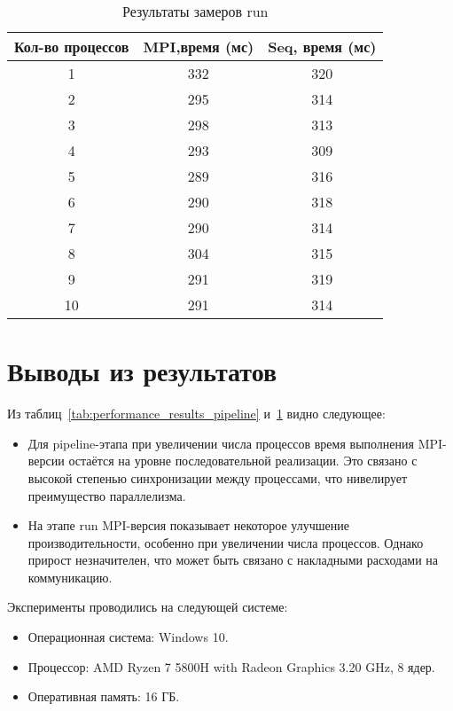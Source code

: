 \documentclass[12pt]{article}
\begin{document}
\begin{table}[htbp]
\centering
\caption{Результаты замеров run}
\begin{tabular}{|c|c|c|}
    \hline
    \textbf{Кол-во процессов} & \textbf{MPI,время (мс)} & \textbf{Seq, время (мс)} \\ \hline
    1 & 332  & 320 \\ \hline
    2 & 295  & 314 \\ \hline
    3 & 298  & 313 \\ \hline
    4 & 293  & 309 \\ \hline
    5 & 289  & 316 \\ \hline
    6 & 290  & 318 \\ \hline
    7 & 290  & 314 \\ \hline
    8 & 304  & 315 \\ \hline
    9 & 291  & 319 \\ \hline
    10 & 291  & 314 \\ \hline
\end{tabular}
\label{tab:performance_results_run}
\end{table}
\section{Выводы из результатов}

\hspace*{1.25em}Из таблиц~\ref{tab:performance_results_pipeline} и~\ref{tab:performance_results_run} видно следующее:
\begin{itemize}
    \item Для pipeline-этапа при увеличении числа процессов время выполнения MPI-версии остаётся на уровне последовательной реализации. Это связано с высокой степенью синхронизации между процессами, что нивелирует преимущество параллелизма.
    \item На этапе run MPI-версия показывает некоторое улучшение производительности, особенно при увеличении числа процессов. Однако прирост незначителен, что может быть связано с накладными расходами на коммуникацию.
\end{itemize}

Эксперименты проводились на следующей системе:
\begin{itemize}
    \item Операционная система: Windows 10.
    \item Процессор: AMD Ryzen 7 5800H with Radeon Graphics            3.20 GHz, 8 ядер.
    \item Оперативная память: 16 ГБ.
\end{itemize}
\end{document}

